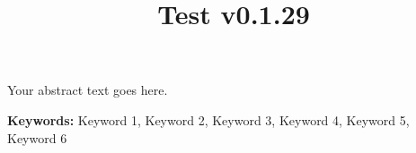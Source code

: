 \documentclass[12pt]{article}
\title{Test v0.1.29}
\date{}
\makeatletter
\renewenvironment{abstract}
  {\begin{flushleft}
   \bfseries \abstractname\vspace{-1em} %
   \end{flushleft}
   \list{}{%
     \setlength{\leftmargin}{0mm}%
     \setlength{\rightmargin}{\leftmargin}%
   }%
   \item\relax}
  {\endlist}
\newcommand{\keywords}[1]{%
    \noindent\textbf{Keywords:} #1
}
\renewcommand{\maketitle}{
  \begin{flushleft} %
    \textbf{\@title} %
    \vspace{1em} %
  \end{flushleft}
}
\makeatother
\begin{document}
\maketitle

\begin{abstract}
Your abstract text goes here.
\end{abstract}

\keywords{Keyword 1, Keyword 2, Keyword 3, Keyword 4, Keyword 5, Keyword 6}



\printpostnotes

\printbibliography[heading=bibliography]
\end{document}
